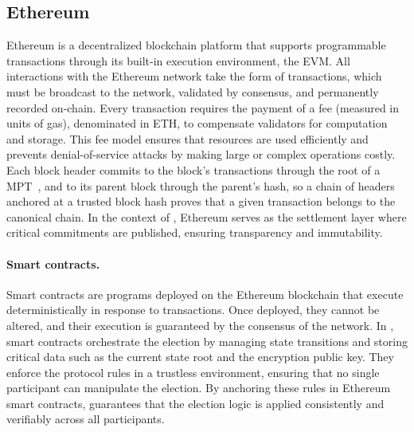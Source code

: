 \subsection{Ethereum}
\label{sec:background:ethereum}

Ethereum is a decentralized blockchain platform that supports programmable transactions through its built-in execution environment, the \acf{EVM}. All interactions with the Ethereum network take the form of transactions, which must be broadcast to the network, validated by consensus, and permanently recorded on-chain. Every transaction requires the payment of a fee (measured in units of gas), denominated in ETH, to compensate validators for computation and storage. This fee model ensures that resources are used efficiently and prevents denial-of-service attacks by making large or complex operations costly. Each block header commits to the block's transactions through the root of a \ac{MPT}~\cite{wood2014ethereum}, and to its parent block through the parent's hash, so a chain of headers anchored at a trusted block hash proves that a given transaction belongs to the canonical chain. In the context of \davinci, Ethereum serves as the settlement layer where critical commitments are published, ensuring transparency and immutability.

\paragraph{Smart contracts.} Smart contracts are programs deployed on the Ethereum blockchain that execute deterministically in response to transactions. Once deployed, they cannot be altered, and their execution is guaranteed by the consensus of the network. In \davinci, smart contracts orchestrate the election by managing state transitions and storing critical data such as the current state root and the encryption public key. They enforce the protocol rules in a trustless environment, ensuring that no single participant can manipulate the election. By anchoring these rules in Ethereum smart contracts, \davinci guarantees that the election logic is applied consistently and verifiably across all participants.

